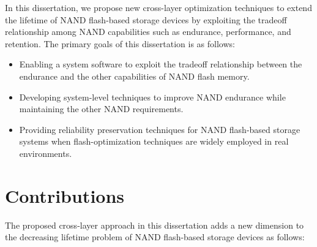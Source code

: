 In this dissertation, we propose new cross-layer optimization techniques to extend the lifetime of NAND flash-based storage devices by exploiting the tradeoff relationship among NAND capabilities such as endurance, performance, and retention.
The primary goals of this dissertation is as follows:

\begin{itemize}
\item Enabling a system software to exploit the tradeoff relationship between the endurance and the other capabilities of NAND flash memory.
\item Developing system-level techniques to improve NAND endurance while maintaining the other NAND requirements.
\item Providing reliability preservation techniques for NAND flash-based storage systems when flash-optimization techniques are widely employed in real environments.
\end{itemize}


\section{Contributions}
\label{sec:Intro_Contributions}

The proposed cross-layer approach in this dissertation adds a new dimension to the decreasing lifetime problem of NAND flash-based storage devices as follows:

